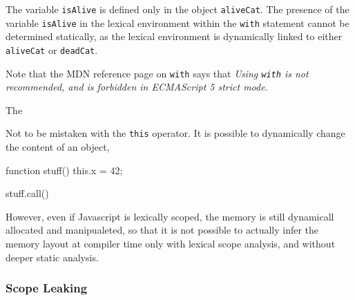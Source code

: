 The variable \texttt{isAlive} is defined only in the object \texttt{aliveCat}.
The presence of the variable \texttt{isAlive} in the lexical environment within the \texttt{with} statement cannot be determined statically, as the lexical environment is dynamically linked to either \texttt{aliveCat} or \texttt{deadCat}.

Note that the MDN reference page on \texttt{with} says that \textit{Using \texttt{with} is not recommended, and is forbidden in ECMAScript 5 strict mode.}

The \texttt{}


Not to be mistaken with the \texttt{this} operator.
It is possible to dynamically change the content of an object,  

\begin{code}
function stuff() {
  this.x = 42;
}

stuff.call({})

\end{code}





However, even if Javascript is lexically scoped, the memory is still dynamicall allocated and manipualeted, so that it is not possible to actually infer the memory layout at compiler time only with lexical scope analysis, and without deeper static analysis.

\subsubsection{Scope Leaking}

